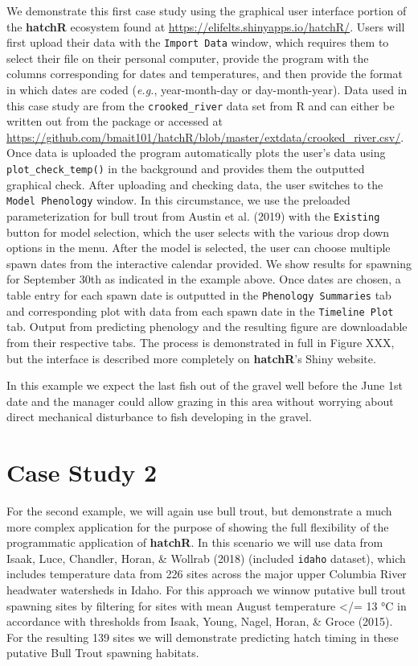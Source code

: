 \documentclass[10pt,a4paper,onecolumn]{article}
\begin{document}
We demonstrate this first case study using the graphical user interface
portion of the \textbf{hatchR} ecosystem found at
\url{https://elifelts.shinyapps.io/hatchR/}. Users will first upload
their data with the \texttt{Import\ Data} window, which requires them to
select their file on their personal computer, provide the program with
the columns corresponding for dates and temperatures, and then provide
the format in which dates are coded (\emph{e.g.}, year-month-day or
day-month-year). Data used in this case study are from the
\texttt{crooked\_river} data set from R and can either be written out
from the package or accessed at
\url{https://github.com/bmait101/hatchR/blob/master/extdata/crooked_river.csv/}.
Once data is uploaded the program automatically plots the user's data
using \texttt{plot\_check\_temp()} in the background and provides them
the outputted graphical check. After uploading and checking data, the
user switches to the \texttt{Model\ Phenology} window. In this
circumstance, we use the preloaded parameterization for bull trout from
Austin et al. (2019) with the \texttt{Existing} button for model
selection, which the user selects with the various drop down options in
the menu. After the model is selected, the user can choose multiple
spawn dates from the interactive calendar provided. We show results for
spawning for September 30th as indicated in the example above. Once
dates are chosen, a table entry for each spawn date is outputted in the
\texttt{Phenology\ Summaries} tab and corresponding plot with data from
each spawn date in the \texttt{Timeline\ Plot} tab. Output from
predicting phenology and the resulting figure are downloadable from
their respective tabs. The process is demonstrated in full in Figure
XXX, but the interface is described more completely on \textbf{hatchR}'s
Shiny website.

In this example we expect the last fish out of the gravel well before
the June 1st date and the manager could allow grazing in this area
without worrying about direct mechanical disturbance to fish developing
in the gravel.

\section{Case Study 2}\label{case-study-2}

For the second example, we will again use bull trout, but demonstrate a
much more complex application for the purpose of showing the full
flexibility of the programmatic application of \textbf{hatchR}. In this
scenario we will use data from Isaak, Luce, Chandler, Horan, \& Wollrab
(2018) (included \texttt{idaho} dataset), which includes temperature
data from 226 sites across the major upper Columbia River headwater
watersheds in Idaho. For this approach we winnow putative bull trout
spawning sites by filtering for sites with mean August temperature
\textless/= 13 °C in accordance with thresholds from Isaak, Young,
Nagel, Horan, \& Groce (2015). For the resulting 139 sites we will
demonstrate predicting hatch timing in these putative Bull Trout
spawning habitats.
\end{document}

